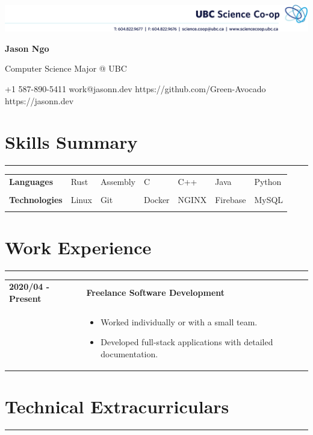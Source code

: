 \documentclass[letterpaper]{article}
\newcommand{\sect}[1]{\section*{#1}
                        {\color{cyan}
                        \rule{\textwidth}{1pt}
                        \vspace{-1ex}}}
\begin{document}
    \includegraphics[width=\textwidth]{ScienceCo-opHeader_2020.png}

    {\Huge
    \textbf{Jason Ngo}}

    \vspace{1ex}
    {\large
    Computer Science Major @ UBC}

    {\small
    +1 587-890-5411
    \hspace*{\fill}
    work@jasonn.dev
    \hspace*{\fill}
    https://github.com/Green-Avocado
    \hspace*{\fill}
    https://jasonn.dev
    }

    \sect{Skills Summary}

        \begin{tabular}{p{}
                        p{}
                        p{}
                        p{}
                        p{}
                        p{}
                        p{}}
            \textbf{Languages} &
                Rust & Assembly & C & C++ & Java & Python \\
                \\
            \textbf{Technologies} &
                Linux & Git & Docker & NGINX & Firebase & MySQL \\
                \\
        \end{tabular}

    \sect{Work Experience}

        \begin{tabular}{p{} p{}} 
            \textbf{2020/04 - Present} & \large\textbf{Freelance Software Development} \\
            & \begin{itemize}
                \item Worked individually or with a small team.
                \item Developed full-stack applications with detailed documentation.
            \end{itemize}
        \end{tabular}

    \sect{Technical Extracurriculars}
\end{document}
